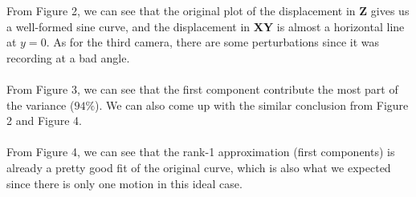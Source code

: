\documentclass{article}
\begin{document}
From Figure 2, we can see that the original plot of the displacement in \textbf{Z} gives us a well-formed sine curve, and the  displacement in \textbf{XY} is almost a horizontal line at $y=0$. As for the third camera, there are some perturbations since it was recording at a bad angle.\\
~\\
From Figure 3, we can see that the first component contribute the most part of the variance ($94\%$). We can also come up with the similar conclusion from Figure 2 and Figure 4.\\
~\\
From Figure 4, we can see that the rank-1 approximation (first components) is already a pretty good fit of the original curve, which is also what we expected since there is only one motion in this ideal case.\\
\end{document}
